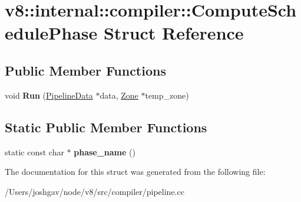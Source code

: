 \hypertarget{structv8_1_1internal_1_1compiler_1_1_compute_schedule_phase}{}\section{v8\+:\+:internal\+:\+:compiler\+:\+:Compute\+Schedule\+Phase Struct Reference}
\label{structv8_1_1internal_1_1compiler_1_1_compute_schedule_phase}
\subsection*{Public Member Functions}
\begin{DoxyCompactItemize}
\item 
void {\bfseries Run} (\hyperlink{classv8_1_1internal_1_1compiler_1_1_pipeline_data}{Pipeline\+Data} $\ast$data, \hyperlink{classv8_1_1internal_1_1_zone}{Zone} $\ast$temp\+\_\+zone)\hypertarget{structv8_1_1internal_1_1compiler_1_1_compute_schedule_phase_ace957b71908a3e75b7203ab1ffd2295b}{}\label{structv8_1_1internal_1_1compiler_1_1_compute_schedule_phase_ace957b71908a3e75b7203ab1ffd2295b}

\end{DoxyCompactItemize}
\subsection*{Static Public Member Functions}
\begin{DoxyCompactItemize}
\item 
static const char $\ast$ {\bfseries phase\+\_\+name} ()\hypertarget{structv8_1_1internal_1_1compiler_1_1_compute_schedule_phase_af7c63c7c5ba6b2b6bf1900e55ad7de53}{}\label{structv8_1_1internal_1_1compiler_1_1_compute_schedule_phase_af7c63c7c5ba6b2b6bf1900e55ad7de53}

\end{DoxyCompactItemize}


The documentation for this struct was generated from the following file\+:\begin{DoxyCompactItemize}
\item 
/\+Users/joshgav/node/v8/src/compiler/pipeline.\+cc\end{DoxyCompactItemize}
